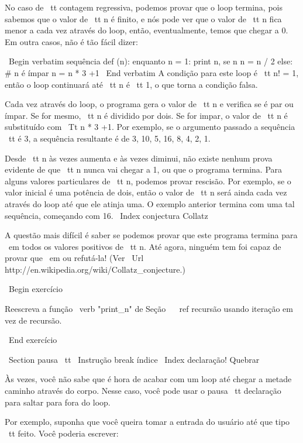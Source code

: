 \documentclass[10pt]{book}
\begin{document}
{{{{No caso de {\ tt contagem regressiva}, podemos provar que o loop
termina, pois sabemos que o valor de {\ tt n} é finito, e nós
pode ver que o valor de {\ tt n} fica menor a cada vez através do
loop, então, eventualmente, temos que chegar a 0. Em outra
casos, não é tão fácil dizer:

\ Begin {verbatim}
sequência def (n):
    enquanto n = 1:
        print n,
        se n%
            n = n / 2
        else: # n é ímpar
            n = n * 3 +1
\ End {verbatim}
%
A condição para este loop é {\ tt n! = 1}, então o loop continuará
até {\ tt n} é {\ tt 1}, o que torna a condição falsa.

Cada vez através do loop, o programa gera o valor de {\ tt n}
e verifica se é par ou ímpar. Se for mesmo, {\ tt n} é
dividido por dois. Se for impar, o valor de {\ tt n} é substituído com
{\ Tt n * 3 +1}. Por exemplo, se o argumento passado
a sequência {\ tt} é 3, a sequência resultante é de 3, 10, 5, 16, 8, 4, 2, 1.

Desde {\ tt n} às vezes aumenta e às vezes diminui, não existe nenhum
prova evidente de que {\ tt n} nunca vai chegar a 1, ou que o programa
termina. Para alguns valores particulares de {\ tt n}, podemos provar
rescisão. Por exemplo, se o valor inicial é uma potência de dois,
então o valor de {\ tt n} será ainda cada vez através do loop
até que ele atinja uma. O exemplo anterior termina com uma tal sequência,
começando com 16.
\ Index {conjectura Collatz}

A questão mais difícil é saber se podemos provar que este programa termina
para {\ em todos os valores positivos de} {\ tt n}. Até agora, ninguém tem
foi capaz de provar que {\ em ou} refutá-la! (Ver
  \ Url {http://en.wikipedia.org/wiki/Collatz_conjecture}.)

\ Begin {} exercício

Reescreva a função \ verb "print_n" de
Seção ~ \ ref {} recursão usando iteração em vez de recursão.

\ End {} exercício


\ Section {{pausa \ tt}}
\ {Instrução break} índice
\ Index {declaração! Quebrar}

Às vezes, você não sabe que é hora de acabar com um loop até chegar a metade
caminho através do corpo. Nesse caso, você pode usar o {pausa \ tt}
declaração para saltar para fora do loop.

Por exemplo, suponha que você queira tomar a entrada do usuário até que
tipo {\ tt feito}. Você poderia escrever:

}}}}
\end{document}
